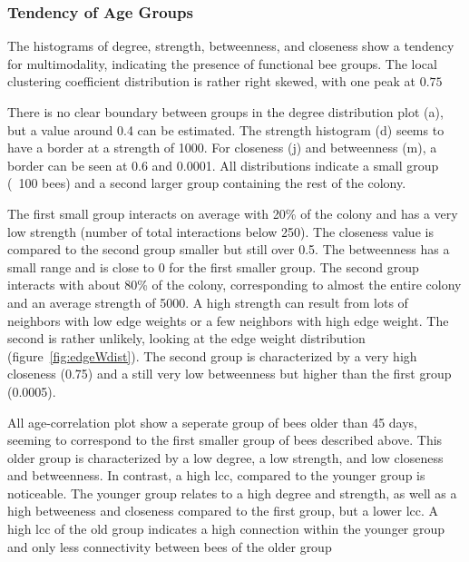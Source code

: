 \subsubsection{Tendency of Age Groups}
The histograms of degree, strength, betweenness, and closeness show a tendency for multimodality, indicating the presence of functional bee groups. The local clustering coefficient distribution is rather right skewed, with one peak at $0.75$

There is no clear boundary between groups in the degree distribution plot (a), but a value around 0.4 can be estimated.
The strength histogram (d) seems to have a border at a strength of 1000.
For closeness (j) and betweenness (m), a border can be seen at 0.6 and 0.0001.
All distributions indicate a small group (~100 bees) and a second larger group containing the rest of the colony.

The first small group interacts on average with 20\% of the colony and has a very low strength (number of total interactions below 250). The closeness value is compared to the second group smaller but still over 0.5. The betweenness has a small range and is close to 0 for the first smaller group.
The second group interacts with about 80\% of the colony, corresponding to almost the entire colony and an average strength of 5000. A high strength can result from lots of neighbors with low edge weights or a few neighbors with high edge weight. The second is rather unlikely, looking at the edge weight distribution (figure~\ref{fig:edgeWdist}). The second group is characterized by a very high closeness (0.75) and a still very low betweenness but higher than the first group (0.0005).

All age-correlation plot show a seperate group of bees older than 45 days, seeming to correspond to the first smaller group of bees described above.
This older group is characterized by a low degree, a low strength, and low closeness and betweenness. In contrast, a high lcc, compared to the younger group is noticeable.
The younger group relates to a high degree and strength, as well as a high betweeness and closeness compared to the first group, but a lower lcc.
A high lcc of the old group indicates a high connection within the younger group and only less connectivity between bees of the older group


